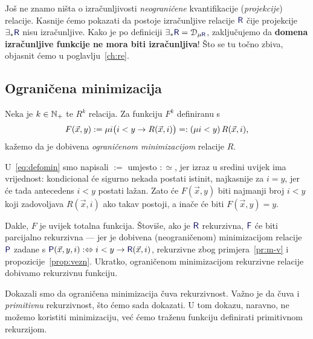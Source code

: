 Još ne znamo ništa o izračunljivosti \emph{neograničene} kvantifikacije (\emph{projekcije}) relacije. Kasnije ćemo pokazati da postoje izračunljive relacije $\f R$ čije projekcije $\exists_*\f R$ nisu izračunljive. Kako je po definiciji $\exists_*\f R=\dom{\mu\f R}$, zaključujemo da \textbf{domena izračunljive funkcije ne mora biti izračunljiva}! Što se tu točno zbiva, objasnit ćemo u poglavlju~\ref{ch:re}. %

\subsection{Ograničena minimizacija}

\begin{definicija}[{name=[ograničena minimizacija]}]
Neka je $k\in{\mathbb N}_+$ te $R^k$ relacija. Za funkciju $F^k$ definiranu s
\begin{equation}\label{eq:defomin}
	F(\vec x,y):=\mu i\bigl(i<y\to R(\vec x,i)\bigr)=:(\mu i<y)\,R(\vec x,i)\text,
\end{equation}
kažemo da je dobivena \emph{ograničenom minimizacijom} relacije $R$.
\end{definicija}

\begin{napomena}[{name=[ograničena minimizacija čuva rekurzivnost]}]\label{nap:mintot}
U~\eqref{eq:defomin} smo napisali $:=$ umjesto $:\simeq$, jer izraz u sredini uvijek ima vrijednost: kondicional će sigurno nekada postati istinit, najkasnije za $i=y$, jer će tada antecedens $i<y$ postati lažan. Zato će $F(\vec x,y)$ biti najmanji broj $i<y$ koji zadovoljava $R(\vec x,i)$ ako takav postoji, a inače će biti $F(\vec x,y)=y$.

	Dakle, $F$ je uvijek totalna funkcija. Štoviše, ako je $\f R$ rekurzivna, $\f F$ će biti parcijalno rekurzivna --- jer je dobivena (neograničenom) minimizacijom relacije $\f P$ zadane s $\f P(\vec x,y,i):\Leftrightarrow i<y\to\f R(\vec x,i)$, rekurzivne zbog primjera~\ref{pr:m-v} i propozicije~\ref{prop:vezn}. Ukratko, ograničenom minimizacijom rekurzivne relacije dobivamo rekurzivnu funkciju.
\end{napomena}

Dokazali smo da ograničena minimizacija čuva rekurzivnost. Važno je da čuva i \emph{primitivnu} rekurzivnost, što ćemo sada dokazati. U tom dokazu, naravno, ne možemo koristiti minimizaciju, već ćemo traženu funkciju definirati primitivnom rekurzijom.

